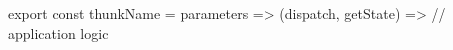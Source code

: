 export const thunkName =
   parameters =>
        (dispatch, getState) => {
            // application logic 
        }